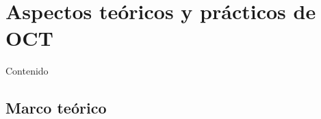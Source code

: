 \documentclass[fleqn,10pt]{beamer}
\begin{document}
\section{Aspectos teóricos y prácticos de OCT}

\begin{frame}{Contenido}
	\tableofcontents[currentsection]
\end{frame}

\subsection{Marco teórico}
\end{document}
